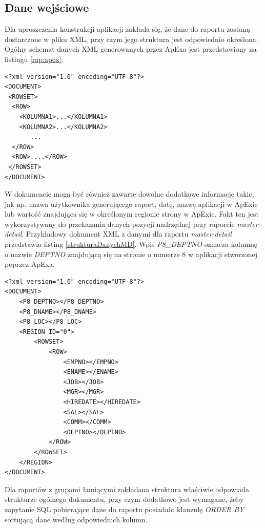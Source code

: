 \documentclass[11pt,a4paper]{article}
\begin{document}
\subsection{Dane wejściowe}\label{sec:appDane}
Dla uproszczenia konstrukcji aplikacji zakłada się, że dane do raportu zostaną dostarczone w pliku XML, przy czym jego struktura jest odpowiednio określona. Ogólny schemat danych XML generowanych przez ApExa jest przedstawiony na listingu \ref{rap:apex}.\\

\lstset{language=XML}
\begin{lstlisting}[frame=single,caption=Ogólna postać dokumentu XML z danymi pochodzącymi z ApExa,label=rap:apex]
<?xml version="1.0" encoding="UTF-8"?>
<DOCUMENT>
 <ROWSET>
  <ROW>
    <KOLUMNA1>...</KOLUMNA1>
    <KOLUMNA2>...</KOLUMNA2>
       ...	
  </ROW>
  <ROW>....</ROW>
 </ROWSET>
</DOCUMENT>
\end{lstlisting}

W dokumencie mogą być również zawarte dowolne dodatkowe informacje takie, jak np. nazwa użytkownika generującego raport, datę, nazwę aplikacji w ApExie lub wartość znajdująca się w określonym regionie strony w ApExie. Fakt ten jest wykorzystywany do przekazania danych pozycji nadrzędnej przy raporcie \emph{master-detail}. Przykładowy dokument XML z danymi dla raportu \emph{master-detail} przedstawia listing \ref{strukturaDanychMD}. Wpis \emph{P8\_DEPTNO} oznacza kolumnę o nazwie \emph{DEPTNO} znajdującą się na stronie o numerze 8 w aplikacji stworzonej poprzez ApExa.


\lstset{language=XML}
\begin{lstlisting}[frame=single,caption=Struktura pliku z danymi wejściowymi dla raportu master-detail,label=strukturaDanychMD]
<?xml version="1.0" encoding="UTF-8"?>
<DOCUMENT>
    <P8_DEPTNO></P8_DEPTNO>
    <P8_DNAME></P8_DNAME>
    <P8_LOC></P8_LOC>
    <REGION ID="0">
        <ROWSET>
            <ROW>
                <EMPNO></EMPNO>
                <ENAME></ENAME>
                <JOB></JOB>
                <MGR></MGR>
                <HIREDATE></HIREDATE>
                <SAL></SAL>
                <COMM></COMM>
                <DEPTNO></DEPTNO>
            </ROW>
        </ROWSET>
    </REGION>
</DOCUMENT>
\end{lstlisting}


Dla raportów z grupami łamiącymi zakładana struktura właściwie odpowiada strukturze ogólnego dokumentu, przy czym dodatkowo jest wymagane, żeby zapytanie SQL pobierające dane do raportu posiadało klauzulę \emph{ORDER BY} sortującą dane według odpowiednich kolumn.
\end{document}
